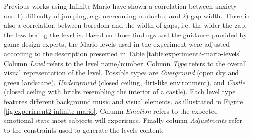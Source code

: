 Previous works using Infinite Mario \parencite{pedersen2009modeling,pedersen2010modeling} have shown a correlation between anxiety and 1) difficulty of jumping, e.g. overcoming obstacles, and 2) gap width. There is also a correlation between boredom and the width of gaps, i.e. the wider the gap, the less boring the level is. Based on those findings and the guidance provided by game design experts, the Mario levels used in the experiment were adjusted according to the description presented in Table \ref{table:experiment2-mario-levels}. Column \textit{Level} refers to the level name/number. Column \textit{Type} refers to the overall visual representation of the level. Possible types are \textit{Overground} (open sky and green landscape), \textit{Underground} (closed ceiling, dirt-like environment), and \textit{Castle} (closed ceiling with bricks resembling the interior of a castle). Each level type features different background music and visual elements, as illustrated in Figure \ref{fig:experiment2-infinite-mario}. Column \textit{Emotion} refers to the expected emotional state most subjects will experience. Finally column \textit{Adjustments} refer to the constraints used to generate the levels content.


